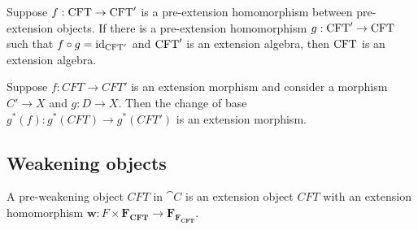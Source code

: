 \begin{lem}
Suppose $f:\mathrm{CFT}\to\mathrm{CFT}'$ is a pre-extension homomorphism between
pre-extension objects. If there is a pre-extension homomorphism $g:\mathrm{CFT}'\to
\mathrm{CFT}$ such that $f\circ g={\mathrm{id}_{\mathrm{CFT}'}}$ and $\mathrm{CFT}'$ is an extension
algebra, then $\mathrm{CFT}$ is an extension algebra.
\end{lem}

\begin{lem}
Suppose $f:CFT\to CFT'$ is an extension morphism and consider a morphism
$C'\to X$ and $g:D\to X$. Then the change of base $g^\ast(f):g^\ast(CFT)\to
g^\ast(CFT')$ is an extension morphism.
\end{lem}

\subsection{Weakening objects}
\begin{defn}
A pre-weakening object $CFT$ in $\cat{C}$ is an extension object $CFT$ with 
an extension homomorphism $\mathbf{w}:F\times\mathbf{F_{CFT}}\to \mathbf{F_{F_{CFT}}}$.
\end{defn}

\begin{comment}
\begin{align*}
w_0 & : F\times F\to F\times_{e_0,c} F\\
w_1 & : F\times(F\times_{e_0,c} F) \to F\times_{e_0,c \circ \pi_2^{e_0,c}} (F\times_{e_0,c}F)\\
w_2 & : F\times(F\times_{e_0,t\circ c} T) \to F\times_{e_0,c}(F\times_{e_0,t\circ c} T)
\end{align*}
for which the following diagrams commute:
\begin{equation*}
\begin{tikzcd}
F\times F \ar{r}{w_0} \ar{dr}[swap]{\pi_1} & F\times_{e_0,c}F \ar{d}{\pi_2^{e_0,c}}\\
& F
\end{tikzcd}
\end{equation*}
\begin{equation*}
\begin{tikzcd}
F\times(F\times_{e_0,c} F) 
  \ar{d}[swap]{\catid{F}\times \pi_2^{e_0,c}}
  \ar{r}{w_1}
  &
F\times_{e_0,c\circ \pi_2^{e_0,c}} (F\times_{e_0,c}F)
  \ar{d}{e_0^\ast(\pi_2^{e_0,c})}
  \\
F\times F
  \ar{r}[swap]{w_0}
  &
F\times_{e_0,c} F
\end{tikzcd}
\end{equation*}
\begin{equation*}
\begin{tikzcd}
F\times(F\times_{e_0,t\circ c} T)
  \ar{r}{w_2}
  \ar{d}[swap]{\catid{F}\times e_0^\ast(t)}
  &
F\times_{e_0,c}(F\times_{e_0,t\circ c} T)
  \ar{d}{e_0^\ast(e_0^\ast(t))}
  \\
F\times(F\times_{e_0,c} F)
  \ar{r}[swap]{w_1}
  &
F\times_{e_0,c\circ \pi_2^{e_0,c}} (F\times_{e_0,c}F)
\end{tikzcd}
\end{equation*}
\end{comment}

